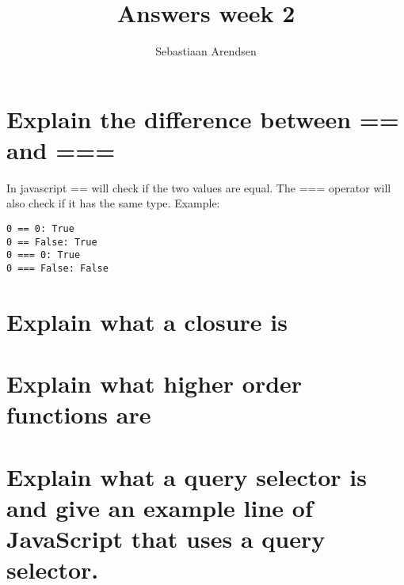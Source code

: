\documentclass[a4paper]{scrartcl}
\title{Answers week 2}
\author{Sebastiaan Arendsen}
\begin{document}
\maketitle

\section{Explain the difference between == and ===}
In javascript == will check if the two values are equal. The === operator will also check if it has the same type. Example:

\begin{lstlisting}
0 == 0: True
0 == False: True
0 === 0: True
0 === False: False
\end{lstlisting}

\section{Explain what a closure is}


\section{Explain what higher order functions are}

\section{Explain what a query selector is and give an example line of JavaScript that uses a query selector.}
\end{document}
